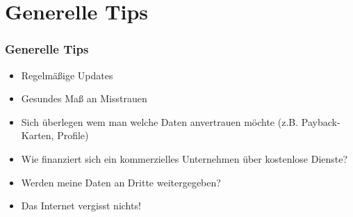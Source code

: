 \section{Generelle Tips}


\begin{frame}
  \frametitle{Generelle Tips}
  \begin{itemize}
   \item Regelmäßige Updates
   \item Gesundes Maß an Misstrauen
   \item Sich überlegen wem man welche Daten anvertrauen möchte (z.B. Payback-Karten, Profile)
   \item Wie finanziert sich ein kommerzielles Unternehmen über kostenlose Dienste?
   \item Werden meine Daten an Dritte weitergegeben?
   \item Das Internet vergisst nichts!
  \end{itemize}
\end{frame}
